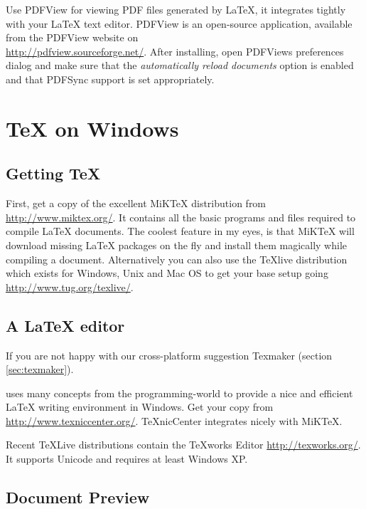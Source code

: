 Use PDFView for viewing PDF files generated by \LaTeX{}, it integrates tightly
with your \LaTeX{} text editor. PDFView is an open-source application, available from the PDFView website on\\
\url{http://pdfview.sourceforge.net/}. After installing, open
PDFViews preferences dialog and make sure that the \emph{automatically reload
documents} option is enabled and that PDFSync support is set appropriately.

\section{\TeX{} on Windows}

\subsection{Getting \TeX{}}

First, get a copy of the excellent MiK\TeX{} distribution from\\
\url{http://www.miktex.org/}. It contains all the basic programs and files
required to compile \LaTeX{} documents.  The coolest feature in my eyes, is
that MiK\TeX{} will download missing \LaTeX{} packages on the fly and install them
magically while compiling a document. Alternatively you can also use
the TeXlive distribution which exists for Windows, Unix and Mac OS to
get your base setup going \url{http://www.tug.org/texlive/}.

\subsection{A \LaTeX{} editor}

If you are not happy with our cross-platform suggestion Texmaker (section \ref{sec:texmaker}).

 uses many concepts from the programming-world to provide a nice and
efficient \LaTeX{} writing environment in Windows. Get your copy from\\
\url{http://www.texniccenter.org/}. TeXnicCenter integrates nicely with
MiKTeX.

Recent \TeX Live distributions contain the \TeX{}works Editor
\url{http://texworks.org/}. It supports Unicode and requires at least Windows XP.

\subsection{Document Preview}

